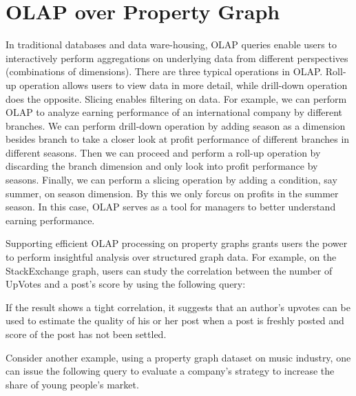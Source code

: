 \section{OLAP over Property Graph}

In traditional databases and data ware-housing, OLAP queries enable users to interactively perform aggregations on underlying data from different perspectives (combinations  of dimensions). There are three typical operations in OLAP. Roll-up operation allows users to view data in more detail, while drill-down operation does the opposite. Slicing enables filtering on data. For example, we can perform OLAP to analyze earning performance of an international company by different branches. We can perform drill-down operation by adding season as a dimension besides branch to take a closer look at profit performance of different branches in different seasons. Then we can proceed and perform a roll-up operation by discarding the branch dimension and only look into profit performance by seasons. Finally, we can perform a slicing operation by adding a condition, say summer, on season dimension. By this we only forcus on profits in the summer season. In this case, OLAP serves as a tool for managers to better understand earning performance.

Supporting efficient OLAP processing on property graphs grants users the power to perform insightful analysis over structured graph data. For example, on the StackExchange graph, users can study the correlation between the number of UpVotes and a post's score by using the following query:


If the result shows a tight correlation, it suggests that an author’s upvotes can be used to estimate the quality of his or her post when a post is freshly posted and score of the post has not been settled.


Consider another example, using a property graph dataset on music industry,  one can issue the following query to evaluate a company's strategy to increase the share of young people's market.


